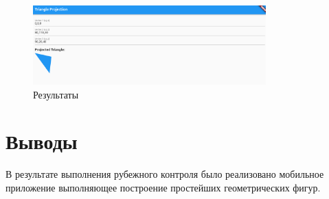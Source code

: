 \documentclass[a4paper, 14pt]{extarticle}
\begin{document}
\begin{figure}[!htb]
	\centering
	\includegraphics[width=0.8\textwidth]{img3}
\caption{Результаты}
\label{fig:img3}
\end{figure}

\section{Выводы}\label{Sect::conclusion}

В результате выполнения рубежного контроля было реализовано мобильное приложение выполняющее построение простейших геометрических фигур.
\end{document}
